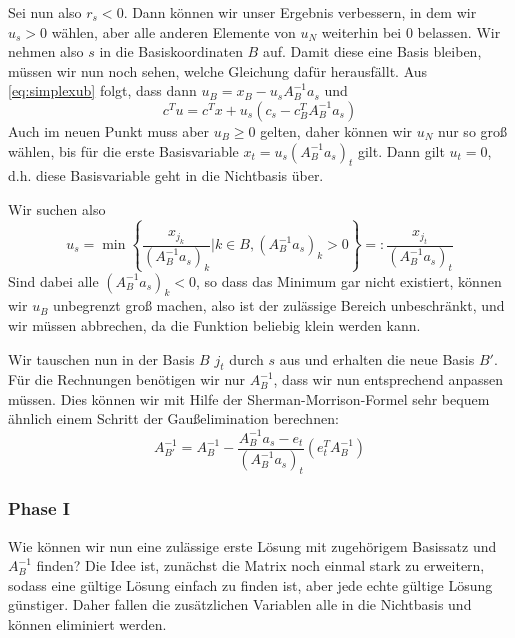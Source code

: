 Sei nun also $r_s< 0$. Dann können wir unser Ergebnis verbessern, in
dem wir $u_s>0$ wählen, aber alle anderen Elemente von $u_N$ weiterhin
bei 0 belassen. Wir nehmen also $s$ in die Basiskoordinaten $B$
auf. Damit diese eine Basis bleiben, müssen wir nun noch sehen, welche
Gleichung dafür herausfällt. Aus \eqref{eq:simplexub} folgt, dass dann
$u_B = x_B - u_s A_B^{-1}a_s$ und
\begin{equation}
  \label{eq:simplextgt}
  c^Tu = c^Tx + u_s(c_s - c_B^T A_B^{-1}a_s)
\end{equation}
Auch im neuen Punkt muss aber $u_B\ge
0$ gelten, daher können wir $u_N$ nur so groß wählen, bis für die erste
Basisvariable $x_t= u_s (A_B^{-1}a_s)_t$ gilt. Dann gilt $u_t=0$,
d.h. diese Basisvariable geht in die Nichtbasis über.

Wir suchen also
\begin{equation}
  u_s = \min \left\{\frac{x_{j_k}}{(A_B^{-1}a_s)_k} | k\in B,
      (A_B^{-1}a_s)_k > 0\right\} =:
  \frac{x_{j_t}}{(A_B^{-1}a_s)_t}
\end{equation}
Sind dabei alle $(A_B^{-1}a_s)_k < 0$, so dass das Minimum gar nicht
existiert, können wir $u_B$ unbegrenzt groß machen, also ist der
zulässige Bereich unbeschränkt, und wir müssen abbrechen, da die
Funktion beliebig klein werden kann.

Wir tauschen nun in der Basis $B$ $j_t$ durch $s$ aus und erhalten die
neue Basis $B'$. Für die Rechnungen benötigen wir nur $A_B^{-1}$, dass
wir nun entsprechend anpassen müssen. Dies können wir mit Hilfe der
Sherman-Morrison-Formel sehr bequem ähnlich einem Schritt der
Gaußelimination berechnen:
\begin{equation}
  \label{eq:simplexex}
  A_{B'}^{-1} = A_{B}^{-1} - \frac{A_B^{-1}a_s - e_t}{(A_B^{-1}a_s)_t}
  \left(e_t^TA_{B}^{-1}\right)
\end{equation}

\subsubsection*{Phase I}

Wie können wir nun eine zulässige erste Lösung mit zugehörigem
Basissatz und $A_B^{-1}$ finden? Die Idee ist, zunächst die Matrix
noch einmal stark zu erweitern, sodass eine gültige Lösung einfach zu
finden ist, aber jede echte gültige Lösung günstiger. Daher fallen die
zusätzlichen Variablen alle in die Nichtbasis und können eliminiert
werden.

